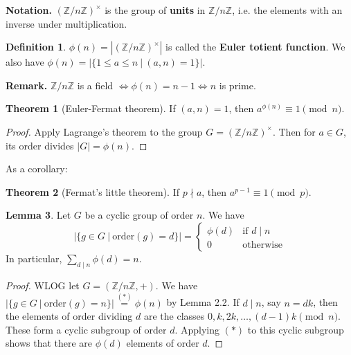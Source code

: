 \documentclass{article}
\theoremstyle{definition}
\newtheorem{theorem}{Theorem}[section]
\newtheorem{lemma}[theorem]{Lemma}
\newtheorem{defn}{Definition}[section]
\begin{document}
\textbf{Notation.} $(\mathbb{Z}/n\mathbb{Z})^{\times}$ is the group of \textbf{units} in $\mathbb{Z}/n\mathbb{Z}$, i.e. the elements with an inverse under multiplication.

\begin{defn}
    $\phi(n) = |(\mathbb{Z}/n\mathbb{Z})^{\times}|$ is called the \textbf{Euler totient function}. We also have $\phi(n) =|\{1 \le a \le n ~|~ (a,n) = 1\}|$. 
\end{defn}

\textbf{Remark.} $\mathbb{Z}/n\mathbb{Z}$ is a field $\iff \phi(n) = n -1 \iff n$ is prime. 

\begin{theorem}[Euler-Fermat theorem]
    If $(a,n)=1$, then $a^{\phi(n)} \equiv 1\pmod{n}$.
\end{theorem}
\begin{proof}
    Apply Lagrange's theorem to the group $G = (\mathbb{Z}/n\mathbb{Z})^{\times}$. Then for $a \in G$, its order divides $|G|= \phi(n)$.
\end{proof}
As a corollary:
\begin{theorem}[Fermat's little theorem]
    If $p \nmid a$, then $a^{p-1} \equiv 1\pmod{p}$.
\end{theorem}

\begin{lemma}%
    Let $G$ be a cyclic group of order $n$. We have \[
    |\{g \in G ~|~ \text{order}(g) = d\}| = \begin{cases}
        \phi(d) &\text{if }d \mid n \\
        0 &\text{otherwise}
    \end{cases}
    \]
    In particular, $\sum_{d \mid n}^{} \phi(d) = n$.
\end{lemma}
\begin{proof}
    WLOG let $G = (\mathbb{Z}/n\mathbb{Z}, +)$. We have $|\{g \in G ~|~ \text{order}(g) = n\}| \stackrel{(*)}{=} \phi(n)$ by Lemma 2.2. If $d \mid n$, say $n = dk$, then the elements of order dividing $d$ are the classes $0, k, 2k, \ldots, (d-1)k \pmod{n}$. These form a cyclic subgroup of order $d$. Applying $(*)$ to this cyclic subgroup shows that there are $\phi(d)$ elements of order $d$.
\end{proof}
\end{document}
